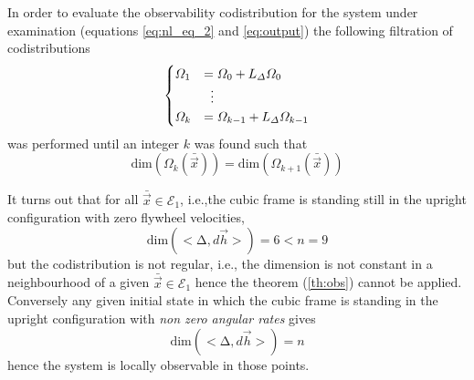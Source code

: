 \par
In order to evaluate the observability codistribution for the system under examination
(equations \ref{eq:nl_eq_2} and \ref{eq:output}) the following filtration of codistributions
\[
\begin{cases}
\Omega_1 &= \Omega_0 + L_\Delta \Omega_0\\
&\vdotswithin{=} \\
\Omega_k &= \Omega_{k-1} + L_\Delta \Omega_{k-1}
\end{cases}
\]
was performed until an integer $k$ was found such that
\[
\mathrm{dim}(\Omega_{k}(\bar{\vec{x}})) = \mathrm{dim}(\Omega_{k + 1}(\bar{\vec{x}}))
\]
\par
It turns out that for all $\bar{\vec{x}} \in \mathcal{E}_{1}$, i.e.,the cubic frame
is standing still in the upright configuration with zero flywheel velocities,
\[
\mathrm{dim} (<\mathrm{\Delta},d\vec{h}>) = 6 < n = 9
\]
but the codistribution is not regular, i.e., the dimension is not constant in a neighbourhood
of a given $\bar{\vec{x}} \in \mathcal{E}_{1}$ hence the theorem (\ref{th:obs}) cannot be applied.
Conversely any given initial state in which the cubic frame is standing in the upright
configuration with \emph{non zero angular rates} gives
\[
\mathrm{dim} (<\mathrm{\Delta},d\vec{h}>) = n
\]
hence the system is locally observable in those points.
\newpage
